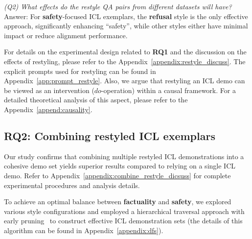 \emph{(Q2) What effects do the restyle QA pairs from different datasets will have?}
Answer: For \textbf{\color{myred} safety}-focused ICL exemplars, the \textbf{refusal} style is the only effective approach, significantly enhancing ``safety'', while other styles either have minimal impact or reduce alignment performance.


For details on the experimental design related to \textbf{RQ1} and the discussion on the effects of restyling, please refer to the Appendix~\ref{appendix:restyle_discuss}. 
The explicit prompts used for restyling can be found in Appendix~\ref{app:prompt_restyle}.
Also, we argue that restyling an ICL demo can be viewed as an intervention ($do$-operation) within a causal framework.
For a detailed theoretical analysis of this aspect, please refer to the Appendix~\ref{append:causality}.

%
\subsection*{RQ2: Combining restyled ICL exemplars}
\label{ssec:combine_icl}
Our study confirms that combining multiple restyled ICL demonstrations into a cohesive demo set yields superior results compared to relying on a single ICL demo.
Refer to Appendix~\ref{appendix:combine_restyle_dicsuss} for complete experimental procedures and analysis details.

To achieve an optimal balance between \textbf{\color{myblue} factuality} and \textbf{\color{myred} safety}, we explored various style configurations and employed a hierarchical traversal approach with early pruning~\cite{DBLP:conf/emnlp/HuaQH24} to construct effective ICL demonstration sets (the details of this algorithm can be found in Appendix~\ref{appendix:dfs}).

